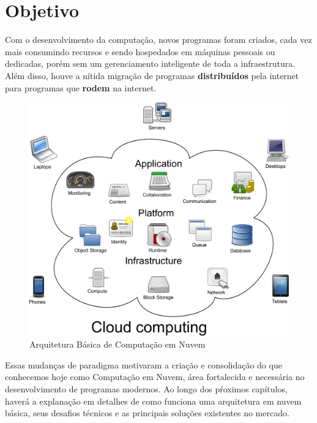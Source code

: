 \chapter{Objetivo}

\nocite{statistics}
\nocite{irms}
\nocite{forbes}


Com o desenvolvimento da computação, novos programas foram criados, cada vez mais consumindo recursos e sendo hospedados em máquinas pessoais ou dedicadas, porém sem um gerenciamento inteligente de toda a infraestrutura. Além disso, houve a nítida migração de programas \textbf{distribuídos} pela internet para programas que \textbf{rodem} na internet.

\begin{figure}[h!]
  \centering
  \includegraphics[scale=0.40]{imagens/cloud_computing.eps}
  \caption{Arquitetura Básica de Computação em Nuvem\cite{cloudcomputing}}
\end{figure}

Essas mudanças de paradigma motivaram a criação e consolidação do que conhecemos hoje como Computação em Nuvem, área fortalecida e necessária no desenvolvimento de programas modernos. Ao longo dos pŕoximos capítulos, haverá a explanação em detalhes de como funciona uma arquitetura em nuvem básica, seus desafios técnicos e as principais soluções existentes no mercado.
